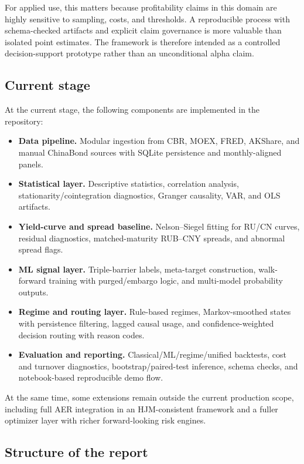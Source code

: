 \documentclass[a4paper,12pt]{extarticle}
\begin{document}
For applied use, this matters because profitability claims in this domain are highly sensitive to sampling, costs, and thresholds. A reproducible process with schema-checked artifacts and explicit claim governance is more valuable than isolated point estimates. The framework is therefore intended as a controlled decision-support prototype rather than an unconditional alpha claim.

\subsection{Current stage}

At the current stage, the following components are implemented in the repository:
\begin{itemize}
\item \textbf{Data pipeline.} Modular ingestion from CBR, MOEX, FRED, AKShare, and manual ChinaBond sources with SQLite persistence and monthly-aligned panels.
\item \textbf{Statistical layer.} Descriptive statistics, correlation analysis, stationarity/cointegration diagnostics, Granger causality, VAR, and OLS artifacts.
\item \textbf{Yield-curve and spread baseline.} Nelson--Siegel fitting for RU/CN curves, residual diagnostics, matched-maturity RUB--CNY spreads, and abnormal spread flags.
\item \textbf{ML signal layer.} Triple-barrier labels, meta-target construction, walk-forward training with purged/embargo logic, and multi-model probability outputs.
\item \textbf{Regime and routing layer.} Rule-based regimes, Markov-smoothed states with persistence filtering, lagged causal usage, and confidence-weighted decision routing with reason codes.
\item \textbf{Evaluation and reporting.} Classical/ML/regime/unified backtests, cost and turnover diagnostics, bootstrap/paired-test inference, schema checks, and notebook-based reproducible demo flow.
\end{itemize}

At the same time, some extensions remain outside the current production scope, including full AER integration in an HJM-consistent framework and a fuller optimizer layer with richer forward-looking risk engines.

\subsection{Structure of the report}
\end{document}
